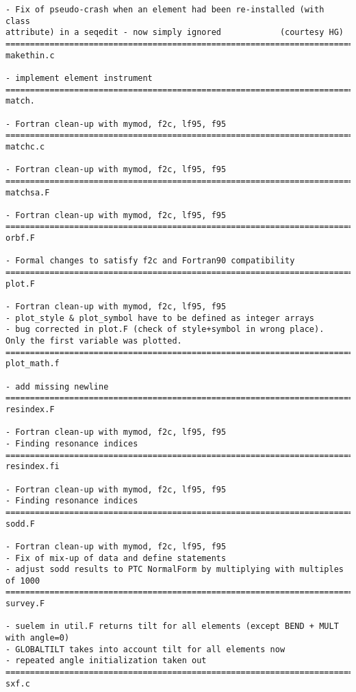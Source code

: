 \begin{verbatim}
- Fix of pseudo-crash when an element had been re-installed (with class
attribute) in a seqedit - now simply ignored            (courtesy HG)
=============================================================================
makethin.c

- implement element instrument
=============================================================================
match.

- Fortran clean-up with mymod, f2c, lf95, f95
=============================================================================
matchc.c

- Fortran clean-up with mymod, f2c, lf95, f95
=============================================================================
matchsa.F

- Fortran clean-up with mymod, f2c, lf95, f95
=============================================================================
orbf.F

- Formal changes to satisfy f2c and Fortran90 compatibility
=============================================================================
plot.F

- Fortran clean-up with mymod, f2c, lf95, f95
- plot_style & plot_symbol have to be defined as integer arrays
- bug corrected in plot.F (check of style+symbol in wrong place).
Only the first variable was plotted.
=============================================================================
plot_math.f

- add missing newline
=============================================================================
resindex.F

- Fortran clean-up with mymod, f2c, lf95, f95
- Finding resonance indices
=============================================================================
resindex.fi

- Fortran clean-up with mymod, f2c, lf95, f95
- Finding resonance indices
=============================================================================
sodd.F

- Fortran clean-up with mymod, f2c, lf95, f95
- Fix of mix-up of data and define statements
- adjust sodd results to PTC NormalForm by multiplying with multiples of 1000
=============================================================================
survey.F

- suelem in util.F returns tilt for all elements (except BEND + MULT
with angle=0)
- GLOBALTILT takes into account tilt for all elements now
- repeated angle initialization taken out
=============================================================================
sxf.c


\end{verbatim}
